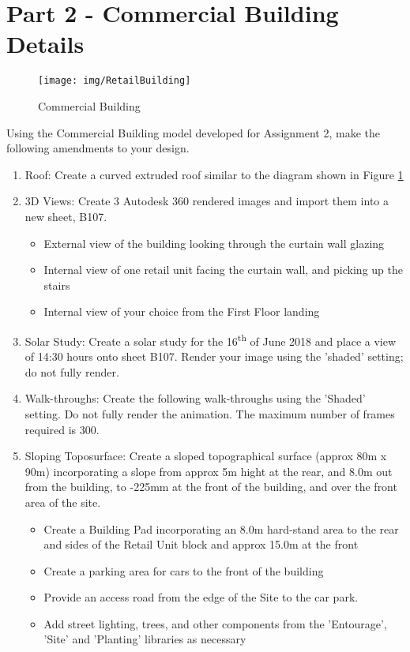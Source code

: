 \newpage

\section*{Part 2 - Commercial Building Details}

\begin{figure}
	\centering
	\texttt{[image: img/RetailBuilding]}
	\caption{Commercial Building}
	\label{fig:retailbuilding}
\end{figure}



Using the Commercial Building model developed for Assignment 2, make the following amendments to your design. 

\begin{enumerate}
	\item Roof: Create a curved extruded roof similar to the diagram shown in Figure \ref{fig:retailbuilding}
	
	\item 3D Views: Create 3 Autodesk 360 rendered images and import them into a new sheet, B107.
	\begin{itemize}
		\item External view of the building looking through the curtain wall glazing
		\item Internal view of one retail unit facing the curtain wall, and picking up the stairs
		\item Internal view of your choice from the First Floor landing 
	\end{itemize} 
	\item Solar Study: Create a solar study for the 16\textsuperscript{th} of June 2018 and place a view of 14:30 hours onto sheet B107.  Render your image using the 'shaded' setting; do not fully render.  
	\item Walk-throughs: Create the following walk-throughs using the 'Shaded' setting.  Do not fully render the animation.  The maximum number of frames required is 300.
	\item Sloping Toposurface: Create a sloped topographical surface (approx 80m x 90m) incorporating a slope from approx 5m hight at the rear, and 8.0m out from the building, to -225mm at the front of the building, and over the front area of the site.
	\begin{itemize}
		\item Create a Building Pad incorporating an 8.0m hard-stand area to the rear and sides of the Retail Unit block and approx 15.0m at the front
		\item Create a parking area for cars to the front of the building
		\item Provide an access road from the edge of the Site to the car park.
		\item Add street lighting, trees, and other components from the 'Entourage', 'Site' and 'Planting' libraries as necessary 
	\end{itemize}
	
\end{enumerate}


